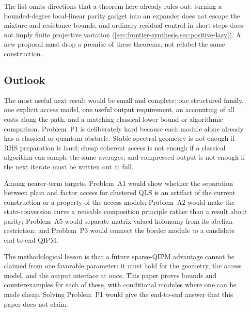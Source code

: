 The list omits directions that a theorem here already rules out: turning a
bounded-degree local-linear parity gadget into an
expander does not escape the mixture and resistance bounds, and ordinary
residual control in short steps does not imply finite projective variation
(\cref{sec:frontier-synthesis,sec:positive-lazy}).  A new proposal must drop a
premise of these theorems, not relabel the same construction.

\subsection{Outlook}
\label{sec:discussion-outlook}

The most useful next result would be small and complete: one structured
family, one explicit access model, one useful
output requirement, an accounting of all costs along the path, and a matching
classical lower bound or algorithmic comparison.  Problem~P1 is deliberately
hard because each module alone already has a classical or quantum
obstacle.  Stable spectral geometry is not enough if RHS preparation is
hard; cheap coherent access is not enough if a classical algorithm can
sample the same averages; and compressed output is not enough if the next
iterate must be written out in full.

Among nearer-term targets, Problem~A1 would show whether the separation
between plain and factor access for clustered QLS is an artifact of the
current construction or a property of the access models; Problem~A2 would
make the state-conversion curve a reusable composition principle rather than
a result about parity; Problem~A5 would separate matrix-valued holonomy from
its abelian restriction; and Problem~P3 would connect the border module to a
candidate end-to-end QIPM.

The methodological lesson is that a future sparse-QIPM advantage cannot be
claimed from one favorable parameter: it must hold for the geometry, the
access model, and the output interface at once.  This paper proves bounds
and counterexamples for each of these, with conditional modules where one
can be made cheap.  Solving Problem~P1 would give the end-to-end answer that
this paper does not claim.

